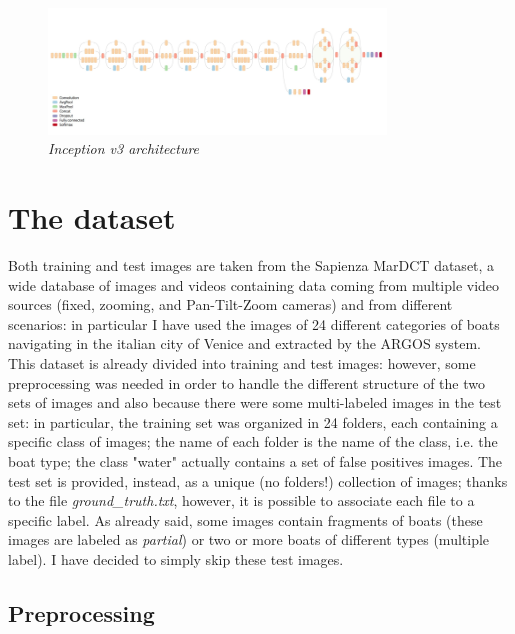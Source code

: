 \documentclass[12pt]{article}
\begin{document}
\begin{figure}[!ht]
	\centering %
	\includegraphics[width=0.8\textwidth]{inceptionv3.png} %
	\caption{\textit{Inception v3 architecture}} %
	\label{fig:inceptionv3}
\end{figure}

\section{The dataset}
\label{sec:dataset}
Both training and test images are taken from the Sapienza MarDCT dataset, a wide database of images and videos containing data coming from multiple video sources (fixed, zooming, and Pan-Tilt-Zoom cameras) and from different scenarios: in particular I have used the images of 24 different categories of boats navigating in the italian city of Venice and extracted by the ARGOS system. This dataset is already divided into training and test images: however, some preprocessing was needed in order to handle the different structure of the two sets of images and also because there were some multi-labeled images in the test set: in particular, the training set was organized in 24 folders, each containing a specific class of images; the name of each folder is the name of the class, i.e. the boat type; the class "water" actually contains a set of false positives images. The test set is provided, instead, as a unique (no folders!) collection of images; thanks to the file \textit{ground\_truth.txt}, however, it is possible to associate each file to a specific label. As already said, some images contain fragments of boats (these images are labeled as \textit{partial}) or two or more boats of different types (multiple label). I have decided to simply skip these test images.

\subsection{Preprocessing}
\label{sec:preprocessing}
\end{document}
